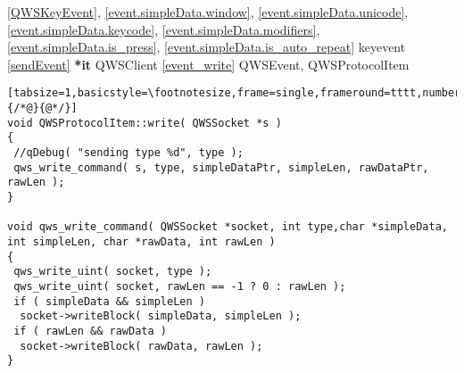 \ref{QWSKeyEvent}, \ref{event.simpleData.window}, \ref{event.simpleData.unicode}, \ref{event.simpleData.keycode}, \ref{event.simpleData.modifiers},
\ref{event.simpleData.is_press}, \ref{event.simpleData.is_auto_repeat}
{\McQ{}} keyevent {\MbQ{}}\zZ
{\McQ{}} \ref{sendEvent} {\McQ{}} \textbf{*it} {\MbQ{}} QWSClient{\MaQ{}}\zZ
{\MiQ{}} \ref{event_write} {\McQ{}} QWSEvent, {\MeQ{}} QWSProtocolItem {\MaQ{}}\zZ

\begin{lstlisting}[tabsize=1,basicstyle=\footnotesize,frame=single,frameround=tttt,numbers=left,breaklines=true,title=\$QTDIR/src/embedded/qwscommand\_{}qws.cpp,escapeinside={/*@}{@*/}]
void QWSProtocolItem::write( QWSSocket *s ) 
{
 //qDebug( "sending type %d", type );
 qws_write_command( s, type, simpleDataPtr, simpleLen, rawDataPtr, rawLen );
}

void qws_write_command( QWSSocket *socket, int type,char *simpleData, int simpleLen, char *rawData, int rawLen )
{
 qws_write_uint( socket, type );
 qws_write_uint( socket, rawLen == -1 ? 0 : rawLen );
 if ( simpleData && simpleLen )
  socket->writeBlock( simpleData, simpleLen );
 if ( rawLen && rawData )
  socket->writeBlock( rawData, rawLen );
}

\end{lstlisting}
